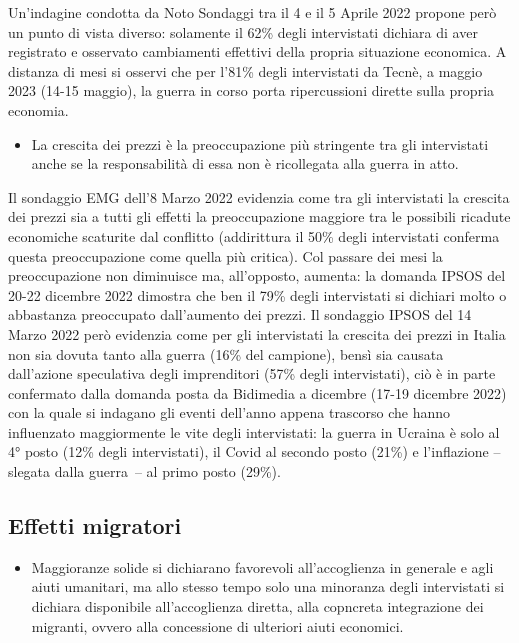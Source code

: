 \documentclass[
  openany]{book}
\providecommand{\tightlist}{%
  \setlength{\itemsep}{0pt}\setlength{\parskip}{0pt}}
\begin{document}
Un'indagine condotta da Noto Sondaggi tra il 4 e il 5 Aprile 2022 propone però un punto di vista diverso: solamente il 62\% degli intervistati dichiara di aver registrato e osservato cambiamenti effettivi della propria situazione economica. A distanza di mesi si osservi che per l'81\% degli intervistati da Tecnè, a maggio 2023 (14-15 maggio), la guerra in corso porta ripercussioni dirette sulla propria economia.

\begin{itemize}
\tightlist
\item
  La crescita dei prezzi è la preoccupazione più stringente tra gli intervistati anche se la responsabilità di essa non è ricollegata alla guerra in atto.
\end{itemize}

Il sondaggio EMG dell'8 Marzo 2022 evidenzia come tra gli intervistati la crescita dei prezzi sia a tutti gli effetti la preoccupazione maggiore tra le possibili ricadute economiche scaturite dal conflitto (addirittura il 50\% degli intervistati conferma questa preoccupazione come quella più critica). Col passare dei mesi la preoccupazione non diminuisce ma, all'opposto, aumenta: la domanda IPSOS del 20-22 dicembre 2022 dimostra che ben il 79\% degli intervistati si dichiari molto o abbastanza preoccupato dall'aumento dei prezzi. Il sondaggio IPSOS del 14 Marzo 2022 però evidenzia come per gli intervistati la crescita dei prezzi in Italia non sia dovuta tanto alla guerra (16\% del campione), bensì sia causata dall'azione speculativa degli imprenditori (57\% degli intervistati), ciò è in parte confermato dalla domanda posta da Bidimedia a dicembre (17-19 dicembre 2022) con la quale si indagano gli eventi dell'anno appena trascorso che hanno influenzato maggiormente le vite degli intervistati: la guerra in Ucraina è solo al 4° posto (12\% degli intervistati), il Covid al secondo posto (21\%) e l'inflazione -- slegata dalla guerra~-- al primo posto (29\%).

\hypertarget{effetti-migratori}{%
\subsection{Effetti migratori}\label{effetti-migratori}}

\begin{itemize}
\tightlist
\item
  Maggioranze solide si dichiarano favorevoli all'accoglienza in generale e agli aiuti umanitari, ma allo stesso tempo solo una minoranza degli intervistati si dichiara disponibile all'accoglienza diretta, alla copncreta integrazione dei migranti, ovvero alla concessione di ulteriori aiuti economici.
\end{itemize}
\end{document}
